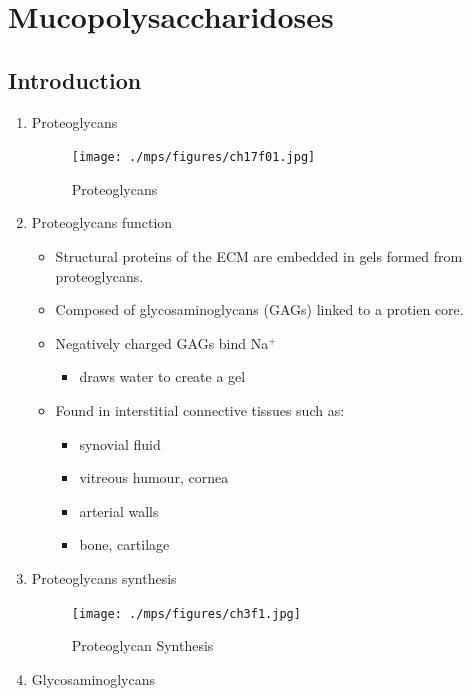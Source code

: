 \documentclass{scrartcl}
\begin{document}
\section{Mucopolysaccharidoses}
\label{sec:org89ed332}
\subsection{Introduction}
\label{sec:org38f9dce}
\begin{enumerate}
\item Proteoglycans
\label{sec:org792b1c6}

\begin{figure}[htbp]
\centering
\texttt{[image: ./mps/figures/ch17f01.jpg]}
\caption[Proteoglycans]{\label{fig:orga6e70d5}
Proteoglycans}
\end{figure}

\item Proteoglycans function
\label{sec:orgc3b138a}

\begin{itemize}
\item Structural proteins of the ECM are embedded in gels formed from
proteoglycans.
\item Composed of glycosaminoglycans (GAGs) linked to a protien core.
\item Negatively charged GAGs bind Na\(^{\text{+}}\)
\begin{itemize}
\item draws water to create a gel
\end{itemize}
\item Found in interstitial connective tissues such as: 
\begin{itemize}
\item synovial fluid
\item vitreous humour, cornea
\item arterial walls
\item bone, cartilage
\end{itemize}
\end{itemize}

\item Proteoglycans synthesis
\label{sec:org482d4d1}

\begin{figure}[htbp]
\centering
\texttt{[image: ./mps/figures/ch3f1.jpg]}
\caption[Proteoglycan Synthesis]{\label{fig:orgf66441a}
Proteoglycan Synthesis}
\end{figure}


\item Glycosaminoglycans
\label{sec:orgc12fb1f}


\end{enumerate}
\end{document}
